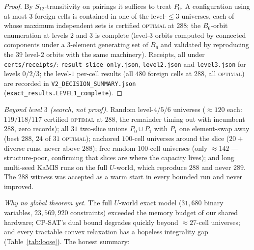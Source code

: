 \documentclass[11pt]{article}
\theoremstyle{remark}
\begin{document}
\begin{proof}
By $S_{12}$-transitivity on pairings it suffices to treat $P_0$. A
configuration using at most $3$ foreign cells is contained in one of the
level-$\le3$ universes, each of whose maximum independent sets is
certified \textsc{optimal} at $288$; the $B_6$-orbit enumeration at levels
$2$ and $3$ is complete (level-$3$ orbits computed by connected components
under a $3$-element generating set of $B_6$ and validated by reproducing
the $39$ level-$2$ orbits with the same machinery). Receipts, all under
\texttt{certs/receipts/}: \texttt{result\_slice\_only.json},
\texttt{level2.json} and \texttt{level3.json} for levels $0/2/3$; the
level-$1$ per-cell results (all $480$ foreign cells at $288$, all
\textsc{optimal}) are recorded in \texttt{V2\_DECISION\_SUMMARY.json}
(\texttt{exact\_results.LEVEL1\_complete}).
\end{proof}

\emph{Beyond level $3$ (search, not proof).} Random level-$4$/$5$/$6$
universes ($\approx120$ each: $119/118/117$ certified \textsc{optimal} at
$288$, the remainder timing out with incumbent $288$, zero records);
all $31$ two-slice unions $P_0\cup P_1$ with $P_1$ one element-swap away
(best $288$, $24$ of $31$ \textsc{optimal}); anchored $100$-cell
universes around the slice ($20+$ diverse runs, never above $288$);
free random $100$-cell universes (only $\approx142$ --- structure-poor,
confirming that slices are where the capacity lives); and long multi-seed
KaMIS runs on the full $U$-world, which reproduce $288$ and never $289$.
The $288$ witness was accepted as a warm start in every bounded run and
never improved.

\emph{Why no global theorem yet.} The full $U$-world exact model
($31{,}680$ binary variables, $23{,}569{,}920$ constraints) exceeded the
memory budget of our shared hardware; CP-SAT's dual bound degrades quickly
beyond $\approx27$-cell universes; and every tractable convex relaxation
has a hopeless integrality gap (Table~\ref{tab:loose}). The honest summary:

\begin{center}
\end{center}
\end{document}

